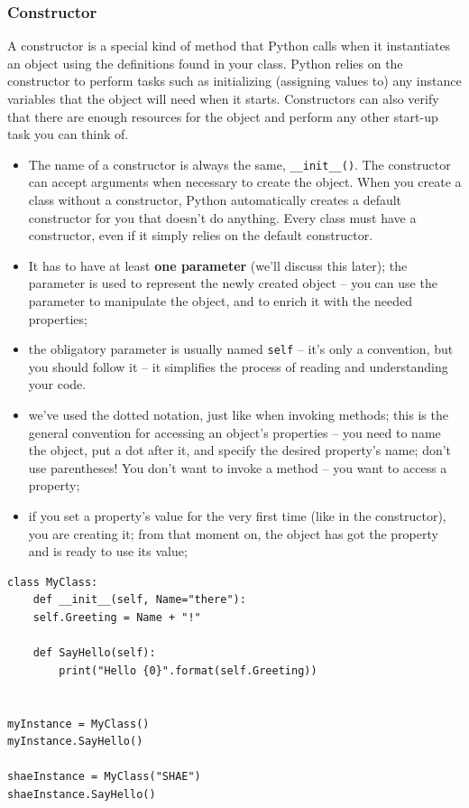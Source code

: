 \documentclass[11pt]{article}
\begin{document}
\subsubsection{Constructor}
\label{sec:orgcc68891}
A constructor is a special kind of method that Python calls when it
instantiates an object using the definitions found in your
class. Python relies on the constructor to perform tasks such as
initializing (assigning values to) any instance variables that the
object will need when it starts. Constructors can also verify that
there are enough resources for the object and perform any other
start-up task you can think of.

\begin{itemize}
\item The name of a constructor is always the same, \texttt{\_\_init\_\_()}. The
constructor can accept arguments when necessary to create the
object. When you create a class without a constructor, Python
automatically creates a default constructor for you that doesn’t do
anything. Every class must have a constructor, even if it simply
relies on the default constructor.
\item It has to have at least \textbf{one parameter} (we’ll discuss this later);
the parameter is used to represent the newly created object – you
can use the parameter to manipulate the object, and to enrich it
with the needed properties;
\item the obligatory parameter is usually named \texttt{self} – it’s only a
convention, but you should follow it – it simplifies the process of
reading and understanding your code.
\item we’ve used the dotted notation, just like when invoking methods;
this is the general convention for accessing an object’s properties
– you need to name the object, put a dot after it, and specify the
desired property’s name; don’t use parentheses! You don’t want to
invoke a method – you want to access a property;
\item if you set a property’s value for the very first time (like in the
constructor), you are creating it; from that moment on, the object
has got the property and is ready to use its value;
\end{itemize}

\begin{verbatim}
class MyClass:
    def __init__(self, Name="there"):
	self.Greeting = Name + "!"

    def SayHello(self):
	    print("Hello {0}".format(self.Greeting))


myInstance = MyClass()
myInstance.SayHello()

shaeInstance = MyClass("SHAE")
shaeInstance.SayHello()
\end{verbatim}
\end{document}
